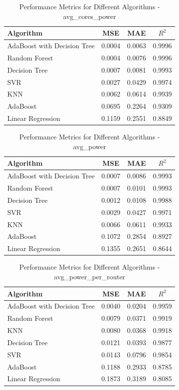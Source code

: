 \documentclass[conference]{IEEEtran}
\begin{document}
\begin{table}[htbp]
	\caption{Performance Metrics for Different Algorithms - avg\_cores\_power}
	\label{tab:avg_cores_power}
	\begin{tabular}{lccc}
		\toprule
		\textbf{Algorithm} & \textbf{MSE} & \textbf{MAE} & \textbf{\(R^2\)} \\
		\midrule
		AdaBoost with Decision Tree & 0.0004 & 0.0063 & 0.9996 \\
		Random Forest & 0.0004 & 0.0076 & 0.9996 \\
		Decision Tree & 0.0007 & 0.0081 & 0.9993 \\
		SVR & 0.0027 & 0.0429 & 0.9974 \\
		KNN & 0.0062 & 0.0614 & 0.9939 \\
		AdaBoost & 0.0695 & 0.2264 & 0.9309 \\
		Linear Regression & 0.1159 & 0.2551 & 0.8849 \\
		\bottomrule
	\end{tabular}
\end{table}


\begin{table}[htbp]
	\caption{Performance Metrics for Different Algorithms - avg\_power}
	\label{tab:avg_power}
	\begin{tabular}{lccc}
		\toprule
		\textbf{Algorithm} & \textbf{MSE} & \textbf{MAE} & \textbf{\(R^2\)} \\
		\midrule
		AdaBoost with Decision Tree & 0.0007 & 0.0086 & 0.9993 \\
		Random Forest & 0.0007 & 0.0101 & 0.9993 \\
		Decision Tree & 0.0012 & 0.0108 & 0.9988 \\
		SVR & 0.0029 & 0.0427 & 0.9971 \\
		KNN & 0.0066 & 0.0611 & 0.9933 \\
		AdaBoost & 0.1072 & 0.2854 & 0.8927 \\
		Linear Regression & 0.1355 & 0.2651 & 0.8644 \\
		\bottomrule
	\end{tabular}
\end{table}

\begin{table}[htbp]
	\caption{Performance Metrics for Different Algorithms - avg\_power\_per\_router}
	\label{tab:avg_power_per_router}
	\begin{tabular}{lccc}
		\toprule
		\textbf{Algorithm} & \textbf{MSE} & \textbf{MAE} & \textbf{\(R^2\)} \\
		\midrule
		AdaBoost with Decision Tree & 0.0040 & 0.0204 & 0.9959 \\
		Random Forest & 0.0079 & 0.0371 & 0.9919 \\
		KNN & 0.0080 & 0.0368 & 0.9918 \\
		Decision Tree & 0.0121 & 0.0393 & 0.9877 \\
		SVR & 0.0143 & 0.0796 & 0.9854 \\
		AdaBoost & 0.1188 & 0.2933 & 0.8785 \\
		Linear Regression & 0.1873 & 0.3189 & 0.8085 \\
		\bottomrule
	\end{tabular}
\end{table}
\end{document}
